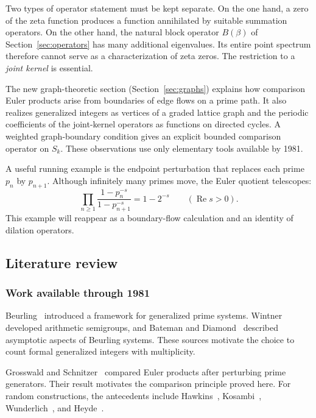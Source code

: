 \documentclass[12pt,letterpaper]{article}
\theoremstyle{definition}
\theoremstyle{remark}
\numberwithin{equation}{section}
\newcommand{\Ree}{\operatorname{Re}}
\begin{document}
Two types of operator statement must be kept separate.  On the one hand,
a zero of the zeta function produces a function annihilated by suitable
summation operators.  On the other hand, the natural block operator
$B(\beta)$ of Section~\ref{sec:operators} has many additional eigenvalues.  Its entire point
spectrum therefore cannot serve as a characterization of zeta zeros.
The restriction to a \emph{joint kernel} is essential.

The new graph-theoretic section (Section~\ref{sec:graphs}) explains how
comparison Euler products arise from boundaries of edge flows on a
prime path.  It also realizes generalized integers as vertices of a
graded lattice graph and the periodic coefficients of the joint-kernel
operators as functions on directed cycles.  A weighted graph-boundary
condition gives an explicit bounded comparison operator on $S_k$.
These observations use only elementary tools available by 1981.

A useful running example is the endpoint perturbation that replaces
each prime $p_n$ by $p_{n+1}$.  Although infinitely many primes move,
the Euler quotient telescopes:
\begin{equation}\label{eq:intro-telescope}
  \prod_{n\ge1}\frac{1-p_n^{-s}}{1-p_{n+1}^{-s}}
  =1-2^{-s}\qquad (\Ree s>0).
\end{equation}
This example will reappear as a boundary-flow calculation and an
identity of dilation operators.

\subsection{Literature review}\label{sec:literature}

\subsubsection*{Work available through 1981}

Beurling~\cite{Be37} introduced a framework for generalized prime
systems.  Wintner~\cite{Wi44} developed arithmetic semigroups, and
Bateman and Diamond~\cite{BD69} described asymptotic aspects of
Beurling systems.  These sources motivate the choice to count formal
generalized integers with multiplicity.

Grosswald and Schnitzer~\cite{GS78} compared Euler products after
perturbing prime generators.  Their result motivates the comparison
principle proved here.  For random constructions, the antecedents
include Hawkins~\cite{Ha58}, Kosambi~\cite{Ko59},
Wunderlich~\cite{Wu74}, and Heyde~\cite{He78}.
\end{document}
